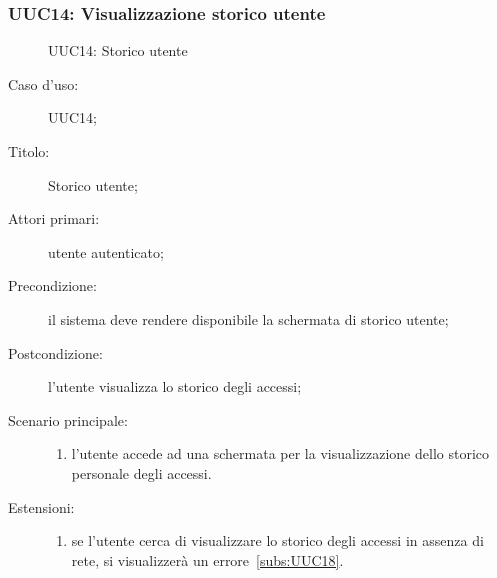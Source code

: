 \documentclass[../../../analisi-dei-requisiti.tex]{subfiles}
\begin{document}
\subsubsection{UUC14: Visualizzazione storico utente}%
\label{subs:UUC14}

\begin{figure}[H]
  \centering
  \caption{UUC14: Storico utente}%
  \label{fig:UUC14}
\end{figure}

\begin{description}
  \item[Caso d'uso:] UUC14;
  \item[Titolo:] Storico utente;
  \item[Attori primari:] utente autenticato;
  \item[Precondizione:] il sistema deve rendere disponibile la schermata di storico utente;
  \item[Postcondizione:] l'utente visualizza lo storico degli accessi;
  \item[Scenario principale:]
        \begin{enumerate}
          \item l'utente accede ad una schermata per la visualizzazione dello storico personale degli accessi.
        \end{enumerate}
  \item[Estensioni:]
        \begin{enumerate}
          \item se l'utente cerca di visualizzare lo storico degli accessi in assenza di rete, si visualizzerà un errore~\ref{subs:UUC18}.
        \end{enumerate}
\end{description}
\end{document}
